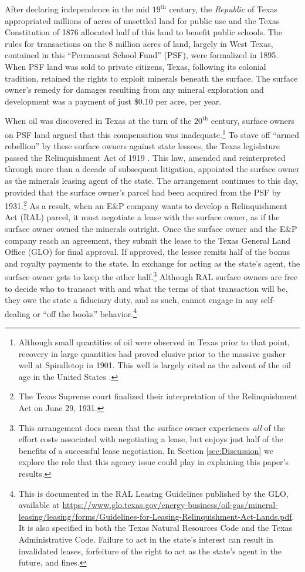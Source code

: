 After declaring independence in the mid $19^{\text{th}}$ century, the \textit{Republic} of Texas appropriated millions of acres of unsettled land for public use and the Texas Constitution of 1876 allocated half of this land to benefit public schools. The rules for transactions on the 8 million acres of land, largely in West Texas, contained in this ``Permanent School Fund'' (PSF), were formalized in 1895.  When PSF land was sold to private citizens, Texas, following its colonial tradition, retained the rights to exploit minerals beneath the surface. The surface owner's remedy for damages resulting from any mineral exploration and development was a payment of just \$0.10 per acre, per year. 

When oil was discovered in Texas at the turn of the $20^{\text{th}}$ century, surface owners on PSF land argued that this compensation was inadequate.\footnote{Although small quantities of oil were observed in Texas prior to that point, recovery in large quantities had proved elusive prior to the massive gusher well at Spindletop in 1901. This well is largely cited as the advent of the oil age in the United States \citep{yergin_prize_2008}.} To stave off ``armed rebellion'' by these surface owners against state lessees, the Texas legislature passed the Relinquishment Act of 1919 \citep{shields_leasing_1981}. This law, amended and reinterpreted through more than a decade of subsequent litigation, appointed the surface owner as the minerals leasing agent of the state. The arrangement continues to this day, provided that the surface owner's parcel had been acquired from the PSF by 1931.\footnote{The Texas Supreme court finalized their interpretation of the Relinquishment Act on June 29, 1931.} As a result, when an E\&P company wants to develop a Relinquishment Act (RAL) parcel, it must negotiate a lease with the surface owner, as if the surface owner owned the minerals outright.  Once the surface owner and the E\&P company reach an agreement, they submit the lease to the Texas General Land Office (GLO) for final approval. If approved, the lessee remits half of the bonus and royalty payments to the state. In exchange for acting as the state's agent, the surface owner gets to keep the other half.\footnote{This arrangement does mean that the surface owner experiences \textit{all} of the effort costs associated with negotiating a lease, but enjoys just half of the benefits of a successful lease negotiation.  In Section \ref{sec:Discussion} we explore the role that this agency issue could play in explaining this paper's results.}  Although RAL surface owners are free to decide who to transact with and what the terms of that transaction will be, they owe the state a fiduciary duty, and as such, cannot engage in any self-dealing or ``off the books'' behavior.\footnote{This is documented in the RAL Leasing Guidelines published by the GLO, available at \url{https://www.glo.texas.gov/energy-business/oil-gas/mineral-leasing/leasing/forms/Guidelines-for-Leasing-Relinquishment-Act-Lands.pdf}.  It is also specified in both the Texas Natural Resources Code and the Texas Administrative Code.  Failure to act in the state's interest can result in invalidated leases, forfeiture of the right to act as the state's agent in the future, and fines.}  

